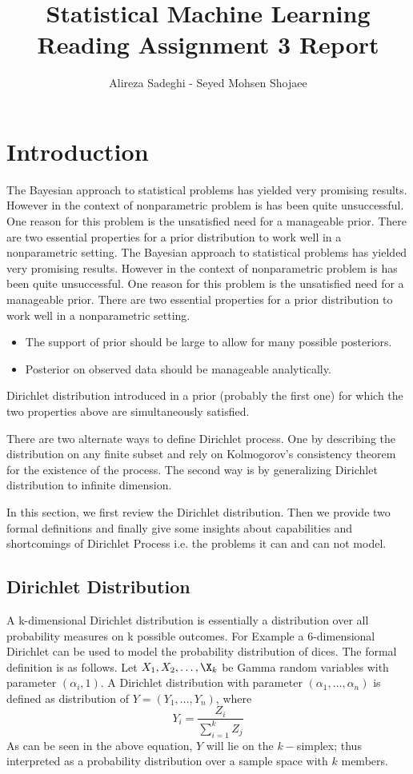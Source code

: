 \documentclass{article}
\title{Statistical Machine Learning \\ Reading Assignment 3 Report}
\author{Alireza Sadeghi - Seyed Mohsen Shojaee}
\begin{document}
\maketitle

\section{Introduction}
The Bayesian approach to statistical problems has yielded very promising results. However in the context
of nonparametric problem is has been quite unsuccessful. One reason for this problem is the unsatisfied need for a manageable prior.
There are two essential properties for a prior distribution to work well in a nonparametric setting.
The Bayesian approach to statistical problems has yielded very promising results. However in the context
of nonparametric problem is has been quite unsuccessful. One reason for this problem is the unsatisfied need for a manageable prior.
There are two essential properties for a prior distribution to work well in a nonparametric setting.
\begin{itemize}
  \item The support of prior should be large to allow for many possible posteriors.
\item Posterior on observed data should be manageable analytically.
\end{itemize}
Dirichlet distribution introduced in \cite{fegusen} a prior
(probably the first one) for which the two properties above are simultaneously satisfied.

There are two alternate ways to define Dirichlet process. One by
describing the distribution on any finite subset and rely on
Kolmogorov's consistency theorem for the existence of the process.
The second way is by generalizing Dirichlet distribution to infinite dimension.

In this section, we first review the Dirichlet distribution. Then we provide two formal definitions and finally
give some insights about capabilities and shortcomings of Dirichlet Process i.e. the problems it can and can not model.

\subsection{Dirichlet Distribution}
A k-dimensional Dirichlet distribution is essentially a distribution over all probability measures on k possible outcomes.
For Example a 6-dimensional Dirichlet can be used to model the probability distribution of dices.
The formal definition is as follows.
Let $X_1, X_2, \ldots, \X_k$ be Gamma random variables with parameter $(\alpha_i, 1)$. A Dirichlet distribution with
parameter 
$(\alpha_1, \ldots, \alpha_n)$  is defined as distribution of $ Y = (Y_1, \ldots, Y_n)$, where
\begin{equation}
  Y_i = \frac{Z_i}{\sum_{i=1}^k Z_j}
\end{equation}
As can be seen in the above equation, $Y$ will lie on the $k-$simplex;
thus interpreted as a probability distribution over a sample space with $k$ members.
\end{document}
